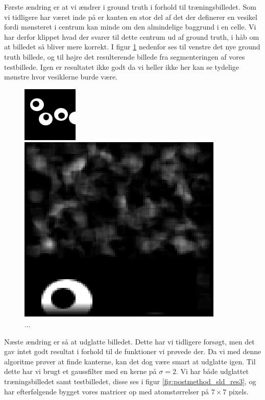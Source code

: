 Første ændring er at vi ændrer i ground truth i forhold til træningsbilledet. Som vi tidligere har været inde på er kanten en stor del af det der definerer en vesikel fordi mønsteret i centrum kan minde om den almindelige baggrund i en celle. Vi har derfor klippet hvad der svarer til dette centrum ud af ground truth, i håb om at billedet så bliver mere korrekt. I figur \ref{fig:postmethod_sld_gt4} nedenfor ses til venstre det nye ground truth billede, og til højre det resulterende billede fra segmenteringen af vores testbillede. Igen er resultatet ikke godt da vi heller ikke her kan se tydelige mønstre hvor vesiklerne burde være.

\begin{figure}[H]
	\begin{minipage}[b]{0.5\linewidth}
		\centering
		\includegraphics[scale=3]{files/postmethod/img/imGT3.png}
	\end{minipage}
	\hspace{0.8cm}
	\begin{minipage}[b]{0.5\linewidth}
		\centering
		\includegraphics[scale=0.42]{files/postmethod/img/sld_res3.png}
	\end{minipage}
	\caption{...\label{fig:postmethod_sld_gt4}}
\end{figure}

Næste ændring er så at udglatte billedet. Dette har vi tidligere forsøgt, men det gav intet godt resultat i forhold til de funktioner vi prøvede der. %
Da vi med denne algoritme prøver at finde kanterne, kan det dog være smart at udglatte igen. Til dette har vi brugt et gaussfilter med en kerne på $\sigma=2$. %
Vi har både udglattet træningsbilledet samt testbilledet, disse ses i figur \ref{fig:postmethod_sld_res3}, og har efterfølgende bygget vores matricer op med atomstørrelser på $7\times7$ pixels.

